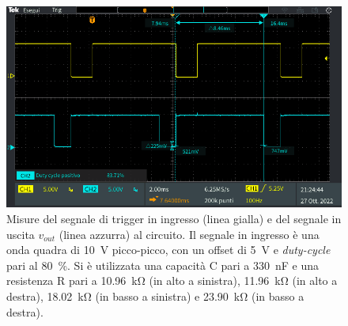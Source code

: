 \begin{figure}[h]
\begin{minipage}{.496\textwidth}
	\end{minipage}
	\begin{minipage}{.496\textwidth}
		\includegraphics[width=\linewidth]{./ImageFiles/Laboratorio 4/TEK00019.PNG}
	\end{minipage}
	\caption{Misure del segnale di trigger in ingresso (linea gialla) e del segnale in uscita $v_{out}$ (linea azzurra) al circuito. Il segnale in ingresso è una onda quadra di \SI{10}{\volt} picco-picco, con un offset di \SI{5}{\volt} e \textit{duty-cycle} pari al \SI{80}{\percent}. Si è utilizzata una capacità C pari a \SI{330}{\nano\farad} e una resistenza R pari a \SI{10,96}{\kilo\ohm} (in alto a sinistra), \SI{11,96}{\kilo\ohm} (in alto a destra), \SI{18,02}{\kilo\ohm} (in basso a sinistra) e \SI{23,90}{\kilo\ohm} (in basso a destra).}
	\label{fig:uscita_circuito_330n}
\end{figure}
